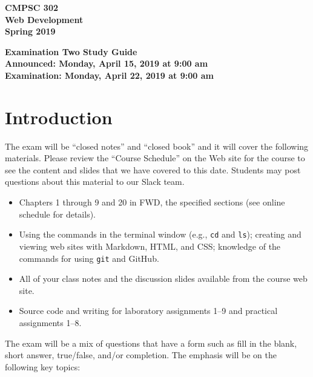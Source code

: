 \documentclass[11pt]{article}
\newcommand{\assignmentduedate}{April 22}
\newcommand{\assignmentassignedate}{April 15}
\newcommand{\assignmentnumber}{Two}
\newcommand{\labyear}{2019}
\newcommand{\assignedday}{Monday}
\newcommand{\dueday}{Monday}
\newcommand{\labtime}{9:00 am}
\newcommand{\assigneddate}{Announced: \assignedday, \assignmentassignedate, \labyear{} at \labtime{}}
\newcommand{\duedate}{Examination: \dueday, \assignmentduedate, \labyear{} at \labtime{}}
\newcommand{\program}[1]{\lstinline{#1}}
\newcommand{\guidetitle}[1]
{
  \begin{center}
    \begin{center}
      \bf
      CMPSC 302\\Web Development\\
      Spring 2019\\
      \medskip
    \end{center}
    \bf
    #1
  \end{center}
}
\begin{document}
\thispagestyle{empty}

\guidetitle{Examination \assignmentnumber{} Study Guide \\ \assigneddate{} \\ \duedate{}}

\section*{Introduction}

\noindent
The exam will be ``closed notes'' and ``closed book'' and it will cover the
following materials. Please review the ``Course Schedule'' on the Web site for
the course to see the content and slides that we have covered to this date.
Students may post questions about this material to our Slack team.

\begin{itemize}

  \itemsep 0in

  \item Chapters 1 through 9 and 20 in FWD, the specified sections (see online
    schedule for details).

  \item Using the commands in the terminal window (e.g., \program{cd} and
    \program{ls}); creating and viewing web sites with Markdown, HTML, and CSS;
    knowledge of the commands for using \program{git} and GitHub.

  \item All of your class notes and the discussion slides available from the
    course web site.

  \item Source code and writing for laboratory assignments 1--9 and practical
    assignments 1--8.

\end{itemize}

\noindent The exam will be a mix of questions that have a form such as fill in
the blank, short answer, true/false, and/or completion. The emphasis will be on
the following key topics:
\end{document}
